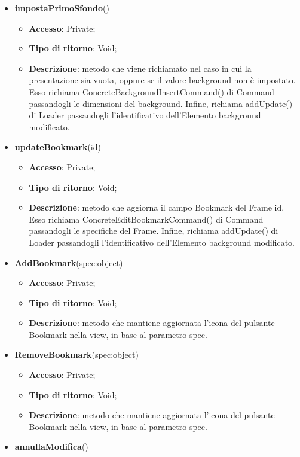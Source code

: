 {{\begin{itemize}
\begin{itemize}
			\end{itemize}
			\item \textbf{impostaPrimoSfondo}()
			\begin{itemize}
				\item \textbf{Accesso}: Private;
				\item \textbf{Tipo di ritorno}: Void;
				\item \textbf{Descrizione}: metodo che viene richiamato nel caso in cui la presentazione sia vuota, oppure se il valore background non è impostato. Esso richiama ConcreteBackgroundInsertCommand() di Command passandogli le dimensioni del background. Infine, richiama addUpdate() di Loader passandogli l'identificativo dell'Elemento background modificato.
			\end{itemize}
			\item \textbf{updateBookmark}(id)
			\begin{itemize}
				\item \textbf{Accesso}: Private;
				\item \textbf{Tipo di ritorno}: Void;
				\item \textbf{Descrizione}: metodo che aggiorna il campo Bookmark\ped{g} del Frame id. Esso richiama ConcreteEditBookmarkCommand() di Command passandogli le specifiche del Frame. Infine, richiama addUpdate() di Loader passandogli l'identificativo dell'Elemento background modificato.
			\end{itemize}
			\item \textbf{AddBookmark}(spec:object)
			\begin{itemize}
				\item \textbf{Accesso}: Private;
				\item \textbf{Tipo di ritorno}: Void;
				\item \textbf{Descrizione}: metodo che mantiene aggiornata l'icona del pulsante Bookmark nella view, in base al parametro spec.
			\end{itemize}
			\item \textbf{RemoveBookmark}(spec:object)
			\begin{itemize}
				\item \textbf{Accesso}: Private;
				\item \textbf{Tipo di ritorno}: Void;
				\item \textbf{Descrizione}: metodo che mantiene aggiornata l'icona del pulsante Bookmark nella view, in base al parametro spec.
			\end{itemize}
			\item \textbf{annullaModifica}()

\end{itemize}}}
